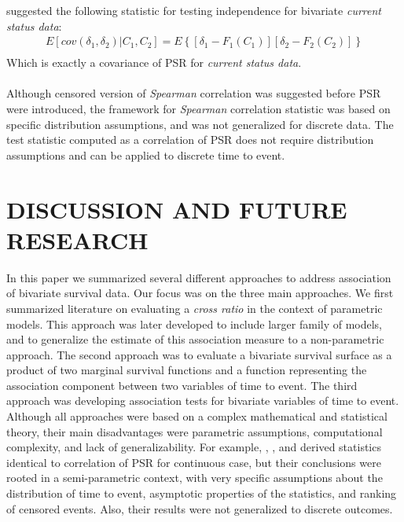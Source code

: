 \documentclass[]{article}
\begin{document}
\cite{ding2004testing} suggested the following statistic for testing independence for bivariate \emph{current status data}:
	$$
	\begin{aligned}
		 E[cov(\delta_1, \delta_2)|C_1,C_2] = E\left\{ [\delta_1 - F_1(C_1)][\delta_2 - F_2(C_2)]  \right\}\\
	\end{aligned}
	$$
Which is exactly a covariance of PSR for \emph{current status data}.\\
~\\
Although censored version of \emph{Spearman} correlation was suggested before PSR were introduced, the framework for \emph{Spearman} correlation statistic was based on specific distribution assumptions, and was not generalized for discrete data. The test statistic computed as a correlation of PSR does not require distribution assumptions and can be applied to discrete time to event.

\section{DISCUSSION AND FUTURE RESEARCH}

In this paper we summarized several different approaches to address association of bivariate survival data. Our focus was on the three main approaches. We first summarized literature on evaluating a \emph{cross ratio} in the context of parametric models. This approach was later developed to include larger family of models, and to generalize the estimate of this association measure to a non-parametric approach. The second approach was to evaluate a bivariate survival surface as a product of two marginal survival functions and a function representing the association component between two variables of time to event. The third approach was developing association tests for bivariate variables of time to event.\\

Although all approaches were based on a complex mathematical and statistical theory, their main disadvantages were parametric assumptions, computational complexity, and lack of generalizability. For example, \cite{cuzick1982rank}, \cite{dabrowska1988kaplan}, and \cite{ding2004testing} derived statistics identical to correlation of PSR for continuous case, but their conclusions were rooted in a semi-parametric context, with very specific assumptions about the distribution of time to event, asymptotic properties of the statistics, and ranking of censored events. Also, their results were not generalized to discrete outcomes.\\
\end{document}
